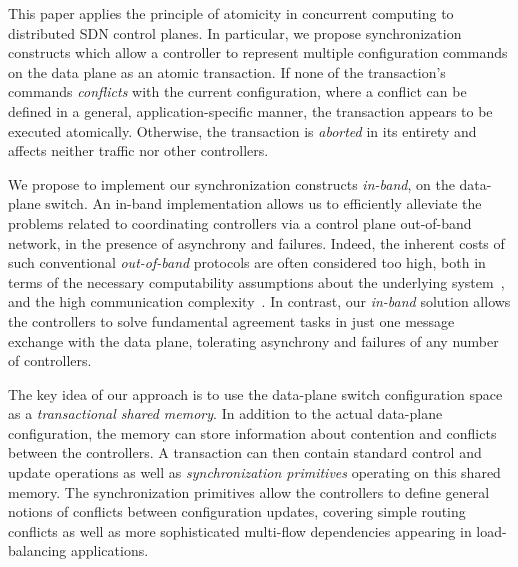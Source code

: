 \documentclass[conference]{sigcomm-alternate}
\newcommand{\liron}[1]{\textit{\textcolor{mypurple}{[liron]: #1}}} %
\begin{document}
This paper applies the principle of atomicity in concurrent computing
to distributed SDN control planes.
%
In particular, we propose synchronization constructs which
allow a controller to represent multiple configuration commands on
the data plane as an atomic transaction.
%
If none of the transaction's commands \emph{conflicts}  with the current
configuration, where a conflict can be
defined in a general, application-specific manner, the transaction appears to be executed atomically.
Otherwise, the transaction is \emph{aborted} in its entirety and 
affects neither traffic nor other controllers.

We propose to implement our synchronization constructs \emph{in-band},
on the data-plane switch.
An in-band implementation allows us to efficiently alleviate the problems related to
coordinating controllers via a control plane
out-of-band network, in the presence of asynchrony and failures.
Indeed, the inherent costs  of such conventional \emph{out-of-band} 
protocols are often considered too high, both in
terms of the necessary computability assumptions about the underlying
system~\cite{FLP85}, and the high communication
complexity~\cite{Lam06}.
In contrast, our \emph{in-band} solution allows the
controllers to solve fundamental agreement tasks in just one message
exchange 
with the data plane, tolerating asynchrony and failures of
any number of controllers.

The key idea of our approach is to use the data-plane switch configuration space
as a \emph{transactional shared memory}.
In addition to the actual data-plane configuration, the memory can store information about  contention and conflicts
between the controllers.
A transaction can then contain standard control and update operations
as well as  \emph{synchronization primitives} operating on this shared
memory.
The synchronization primitives allow the controllers to define
general notions of conflicts between configuration updates,
covering simple routing conflicts 
as well as more sophisticated multi-flow dependencies appearing in load-balancing applications.   
\end{document}
